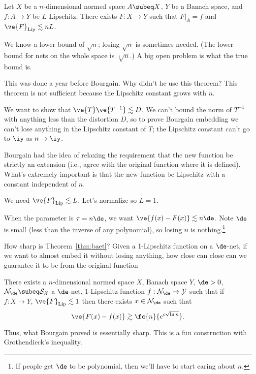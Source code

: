 \begin{thm}
Let $X$ be a $n$-dimensional normed space $A\subeq X$, $Y$ be a Banach space, and $f:A\to Y$ be $L$-Lipschitz. There exists $F:X\to Y$ such that $F|_A=f$ and $\ve{F}_{\text{Lip}}\lesssim nL$.
\end{thm}
We know a lower bound of $\sqrt n$; losing $\sqrt n$ is sometimes needed. (The lower bound for nets on the whole space is $\sqrt[4]{n}$.) A big open problem is what the true bound is. 

This was done a year before Bourgain. Why didn't he use this theorem? This theorem is not sufficient because the Lipschitz constant grows with $n$.

We want to show that $\ve{T}\ve{T^{-1}}\lesssim D$. We can't bound the norm of $T^{-1}$ with anything less than the distortion $D$, so to prove Bourgain embedding we can't lose anything in the Lipschitz constant of $T$; the Lipschitz constant can't go to $\iy$ as $n\to \iy$. 

Bourgain had the idea of relaxing the requirement that the new function be strictly an extension (i.e., agree with the original function where it is defined). What's extremely important  is that the new function be Lipschitz with a constant independent of $n$.
 
We need $\ve{F}_{\text{Lip}}\lesssim L$. 
Let's normalize so $L=1$. 

When the parameter is $\tau=n\de$, we want $\ve{f(x)-F(x)}\lesssim n\de$. Note $\de$ is small (less than the inverse of any polynomial), so losing $n$ is nothing.\footnote{If people get $\de$ to be polynomial, then we'll have to start caring about $n$.}

How sharp is Theorem~\ref{thm:baet}? Given a 1-Lipschitz function on a $\de$-net, if we want to almost embed it without losing anything, how close can close can we guarantee it to  be from the original function
\begin{thm}
There exists a $n$-dimensional normed space $X$, Banach space $Y$, $\de>0$, $\cal N_\de\subeq S_X$ a $\de$-net, 1-Lipschitz function $f:\cal N_\de\to Y$ such that if $f:X\to Y$, $\ve{F}_{\text{Lip}}\lesssim 1$ then there exists $x\in \cal N_\de$ such that 
\[
\ve{F(x)-f(x)}\gtrsim \fc{n}{e^{c\sqrt{\ln n}}}.
\]
\end{thm}
Thus, what Bourgain proved is essentially sharp.
This is a fun construction with Grothendieck's inequality.

